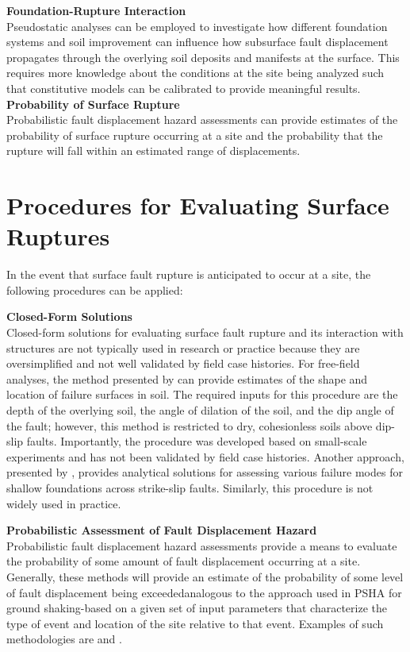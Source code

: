 \noindent\textbf{Foundation-Rupture Interaction}\\
Pseudostatic analyses can be employed to investigate how different foundation systems and soil improvement can influence how subsurface fault displacement propagates through the overlying soil deposits and manifests at the surface. This requires more knowledge about the conditions at the site being analyzed such that constitutive models can be calibrated to provide meaningful results.\\

\noindent\textbf{Probability of Surface Rupture}\\
Probabilistic fault displacement hazard assessments can provide estimates of the probability of surface rupture occurring at a site and the probability that the rupture will fall within an estimated range of displacements.\\

\section{Procedures for Evaluating Surface Ruptures}
\label{sec:eq_surface_rup_procedures}

In the event that surface fault rupture is anticipated to occur at a site, the following procedures can be applied:
\newline

\noindent\textbf{Closed-Form Solutions} \\
Closed-form solutions for evaluating surface fault rupture and its interaction with structures are not typically used in research or practice because they are oversimplified and not well validated by field case histories. For free-field analyses, the method presented by \cite{cole1984influence} can provide estimates of the shape and location of failure surfaces in soil. The required inputs for this procedure are the depth of the overlying soil, the angle of dilation of the soil, and the dip angle of the fault; however, this method is restricted to dry, cohesionless soils above dip-slip faults.  Importantly, the procedure was developed based on small-scale experiments and has not been validated by field case histories. Another approach, presented by \cite{berrill1983two}, provides analytical solutions for assessing various failure modes for shallow foundations across strike-slip faults. Similarly, this procedure is not widely used in practice.
\newline

\noindent\textbf{Probabilistic Assessment of Fault Displacement Hazard}\\
Probabilistic fault displacement hazard assessments provide a means to evaluate the probability of some amount of fault displacement occurring at a site. Generally, these methods will provide an estimate of the probability of some level of fault displacement being exceeded\textemdash analogous to the approach used in PSHA for ground shaking-based on a given set of input parameters that characterize the type of event and location of the site relative to that event. Examples of such methodologies are \cite{youngs2003a, petersen2011fault, moss2011probabilistic} and \cite{hecker2013variability}.\\

